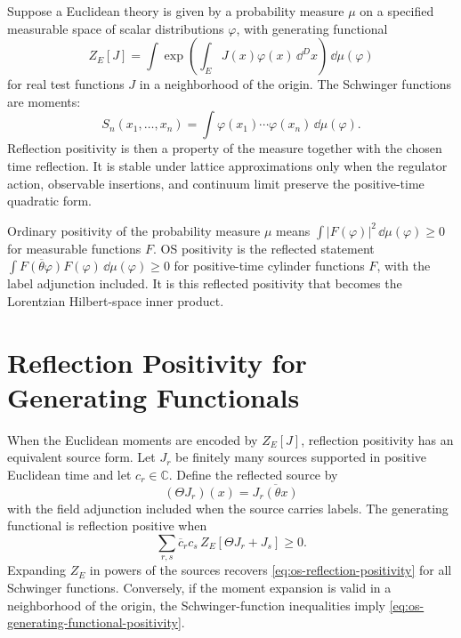 Suppose a Euclidean theory is given by a probability measure \(\mu\) on a
specified measurable space of scalar distributions \(\varphi\), with
generating functional
\[
  Z_E[J]=\int \exp\left(\int_E J(x)\varphi(x)\,\dd^Dx\right)\,\dd\mu(\varphi)
\]
for real test functions \(J\) in a neighborhood of the origin.  The Schwinger
functions are moments:
\[
  S_n(x_1,\ldots,x_n)
  =
  \int \varphi(x_1)\cdots\varphi(x_n)\,\dd\mu(\varphi).
\]
Reflection positivity is then a property of the measure together with the
chosen time reflection.  It is stable under lattice approximations only when
the regulator action, observable insertions, and continuum limit preserve the
positive-time quadratic form.

\begin{remark}
Ordinary positivity of the probability measure \(\mu\) means
\(\int |F(\varphi)|^2\,\dd\mu(\varphi)\ge0\) for measurable functions \(F\).
OS positivity is the reflected statement
\(\int \overline{F(\theta\varphi)}F(\varphi)\,\dd\mu(\varphi)\ge0\) for
positive-time cylinder functions \(F\), with the label adjunction included.
It is this reflected positivity that becomes the Lorentzian Hilbert-space
inner product.
\end{remark}

\section{Reflection Positivity for Generating Functionals}

When the Euclidean moments are encoded by \(Z_E[J]\), reflection positivity
has an equivalent source form.  Let \(J_r\) be finitely many sources supported
in positive Euclidean time and let \(c_r\in\mathbb C\).  Define the reflected
source by
\[
  (\Theta J_r)(x)=\overline{J_r(\theta x)}
\]
with the field adjunction included when the source carries labels.  The
generating functional is reflection positive when
\begin{equation}
  \sum_{r,s}\overline c_r c_s\,
  Z_E[\Theta J_r+J_s]\ge0 .
  \label{eq:os-generating-functional-positivity}
\end{equation}
Expanding \(Z_E\) in powers of the sources recovers
\eqref{eq:os-reflection-positivity} for all Schwinger functions.  Conversely,
if the moment expansion is valid in a neighborhood of the origin, the
Schwinger-function inequalities imply
\eqref{eq:os-generating-functional-positivity}.

